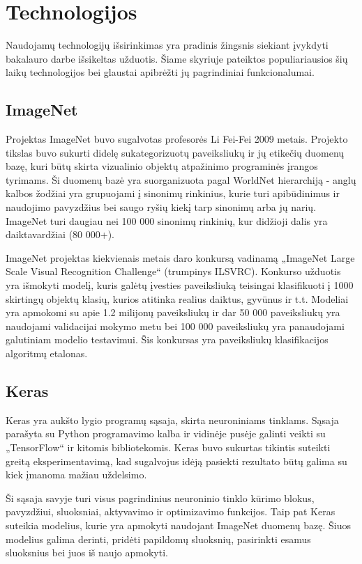 \documentclass{VUMIFPSbakalaurinis}
\begin{document}
\section{Technologijos}
Naudojamų technologijų išsirinkimas yra pradinis žingsnis siekiant įvykdyti bakalauro darbe išsikeltas užduotis. Šiame skyriuje pateiktos populiariausios šių laikų technologijos 
bei glaustai apibrėžti jų pagrindiniai funkcionalumai.

\subsection{ImageNet}
Projektas ImageNet buvo sugalvotas profesorės Li Fei-Fei 2009 metais. Projekto tikslas buvo sukurti didelę sukategorizuotų paveiksliukų ir jų etikečių duomenų bazę, 
kuri būtų skirta vizualinio objektų atpažinimo programinės įrangos tyrimams. Ši duomenų bazė yra suorganizuota pagal WorldNet hierarchiją - anglų kalbos žodžiai 
yra grupuojami į sinonimų rinkinius, kurie turi apibūdinimus ir naudojimo pavyzdžius bei saugo ryšių kiekį tarp sinonimų arba jų narių. ImageNet turi daugiau nei 
100 000 sinonimų rinkinių, kur didžioji dalis yra daiktavardžiai (80 000+). 

ImageNet projektas kiekvienais metais daro konkursą vadinamą „ImageNet Large Scale Visual Recognition Challenge“ (trumpinys ILSVRC). Konkurso užduotis yra 
išmokyti modelį, kuris galėtų įvesties paveiksliuką teisingai klasifikuoti į 1000 skirtingų objektų klasių, kurios atitinka realius daiktus, gyvūnus ir t.t. Modeliai 
yra apmokomi su apie 1.2 milijonų paveiksliukų ir dar 50 000 paveiksliukų yra naudojami validacijai mokymo metu bei 100 000 paveiksliukų yra panaudojami galutiniam 
modelio testavimui. Šis konkursas yra paveiksliukų klasifikacijos algoritmų etalonas.

\subsection{Keras}
Keras yra aukšto lygio programų sąsaja, skirta neuroniniams tinklams. Sąsaja parašyta su Python programavimo kalba ir vidinėje pusėje galinti veikti su „TensorFlow“ 
ir kitomis bibliotekomis. Keras buvo sukurtas tikintis suteikti greitą eksperimentavimą, kad sugalvojus idėją pasiekti rezultato būtų galima su kiek įmanoma mažiau uždelsimo.

Ši sąsaja savyje turi visus pagrindinius neuroninio tinklo kūrimo blokus, pavyzdžiui, sluoksniai, aktyvavimo ir optimizavimo funkcijos. Taip pat Keras suteikia modelius, 
kurie yra apmokyti naudojant ImageNet duomenų bazę. Šiuos modelius galima derinti, pridėti papildomų sluoksnių, pasirinkti esamus sluoksnius bei juos iš naujo apmokyti.
\end{document}
